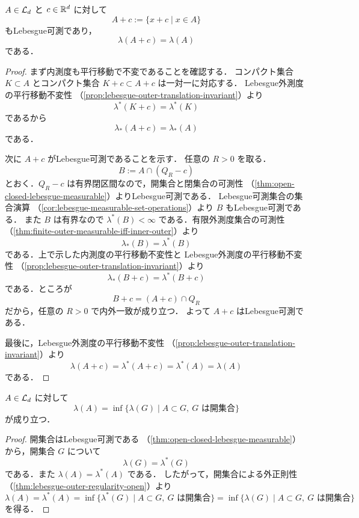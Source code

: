 \begin{proposition}[平行移動不変性]\label{prop:lebesgue-measure-translation-invariant}
$A\in\mathcal L_d$ と $c\in\mathbb R^d$ に対して
\[
A+c:=\{x+c\mid x\in A\}
\]
もLebesgue可測であり，
\[
\lambda(A+c)=\lambda(A)
\]
である．
\end{proposition}
\begin{proof}
まず内測度も平行移動で不変であることを確認する．
コンパクト集合 $K\subset A$ とコンパクト集合 $K+c\subset A+c$ は一対一に対応する．
Lebesgue外測度の平行移動不変性
（\cref{prop:lebesgue-outer-translation-invariant}）より
\[
\lambda^*(K+c)=\lambda^*(K)
\]
であるから
\[
\lambda_*(A+c)=\lambda_*(A)
\]
である．

次に $A+c$ がLebesgue可測であることを示す．
任意の $R>0$ を取る．
\[
B:=A\cap(Q_R-c)
\]
とおく．$Q_R-c$ は有界閉区間なので，開集合と閉集合の可測性
（\cref{thm:open-closed-lebesgue-measurable}）よりLebesgue可測である．
Lebesgue可測集合の集合演算
（\cref{cor:lebesgue-measurable-set-operations}）より $B$ もLebesgue可測である．
また $B$ は有界なので $\lambda^*(B)<\infty$ である．有限外測度集合の可測性
（\cref{thm:finite-outer-measurable-iff-inner-outer}）より
\[
\lambda_*(B)=\lambda^*(B)
\]
である．上で示した内測度の平行移動不変性と
Lebesgue外測度の平行移動不変性
（\cref{prop:lebesgue-outer-translation-invariant}）より
\[
\lambda_*(B+c)=\lambda^*(B+c)
\]
である．ところが
\[
B+c=(A+c)\cap Q_R
\]
だから，任意の $R>0$ で内外一致が成り立つ．
よって $A+c$ はLebesgue可測である．

最後に，Lebesgue外測度の平行移動不変性
（\cref{prop:lebesgue-outer-translation-invariant}）より
\[
\lambda(A+c)=\lambda^*(A+c)=\lambda^*(A)=\lambda(A)
\]
である．
\end{proof}

\begin{theorem}[外正則性]\label{thm:lebesgue-measure-outer-regularity}
$A\in\mathcal L_d$ に対して
\[
\lambda(A)
=
\inf\{\lambda(G)\mid A\subset G,\ G\text{ は開集合}\}
\]
が成り立つ．
\end{theorem}
\begin{proof}
開集合はLebesgue可測である
（\cref{thm:open-closed-lebesgue-measurable}）から，開集合 $G$ について
\[
\lambda(G)=\lambda^*(G)
\]
である．また $\lambda(A)=\lambda^*(A)$ である．
したがって，開集合による外正則性
（\cref{thm:lebesgue-outer-regularity-open}）より
\[
\lambda(A)
=
\lambda^*(A)
=
\inf\{\lambda^*(G)\mid A\subset G,\ G\text{ は開集合}\}
=
\inf\{\lambda(G)\mid A\subset G,\ G\text{ は開集合}\}
\]
を得る．
\end{proof}

